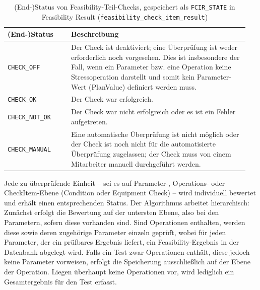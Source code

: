 \begin{table}[!htb]
    \centering
    \caption{(End-)Status von Feasibility-Teil-Checks, gespeichert als \texttt{FCIR\_STATE} in Feasibility Result (\texttt{feasibility\_check\_item\_result})}
    \footnotesize
    \renewcommand{\arraystretch}{1.3} %
    \begin{tabular}{p{0.25\linewidth} p{0.7\linewidth}}
        \toprule
        \textbf{(End-)Status} & \textbf{Beschreibung} \\
        \midrule
        \texttt{CHECK\_OFF} & Der Check ist deaktiviert; eine Überprüfung ist weder erforderlich noch vorgesehen. Dies ist insbesondere der Fall, wenn ein Parameter bzw. eine Operation keine Stressoperation darstellt und somit kein Parameter-Wert (PlanValue) definiert werden muss. \\
        \midrule
        \texttt{CHECK\_OK} & Der Check war erfolgreich. \\
        \midrule
        \texttt{CHECK\_NOT\_OK} & Der Check war nicht erfolgreich oder es ist ein Fehler aufgetreten. \\
        \midrule
        \texttt{CHECK\_MANUAL} & Eine automatische Überprüfung ist nicht möglich oder der Check ist noch nicht für die automatisierte Überprüfung zugelassen; der Check muss von einem Mitarbeiter manuell durchgeführt werden. \\
        \bottomrule
    \end{tabular}
    \label{tab:feasibility-states}
\end{table}

Jede zu überprüfende Einheit – sei es auf Parameter-, Operations- oder CheckItem-Ebene (Condition oder Equipment Check) – wird individuell bewertet und erhält einen entsprechenden Status. Der Algorithmus arbeitet hierarchisch: Zunächst erfolgt die Bewertung auf der untersten Ebene, also bei den Parametern, sofern diese vorhanden sind. Sind Operationen enthalten, werden diese sowie deren zugehörige Parameter einzeln geprüft, wobei für jeden Parameter, der ein prüfbares Ergebnis liefert, ein Feasibility-Ergebnis in der Datenbank abgelegt wird. Falls ein Test zwar Operationen enthält, diese jedoch keine Parameter vorweisen, erfolgt die Speicherung ausschließlich auf der Ebene der Operation. Liegen überhaupt keine Operationen vor, wird lediglich ein Gesamtergebnis für den Test erfasst.

